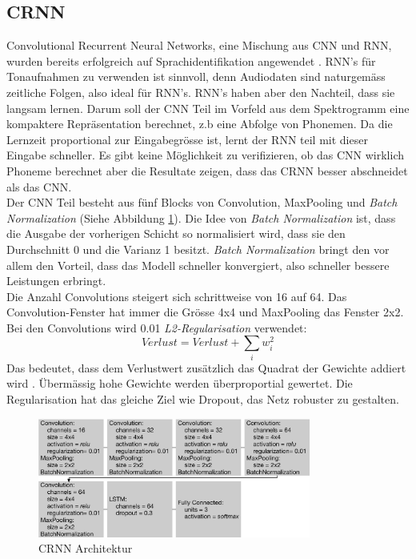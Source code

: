 \subsection{CRNN}
Convolutional Recurrent Neural Networks, eine Mischung aus CNN und RNN, wurden bereits erfolgreich auf Sprachidentifikation angewendet \parencite{crnn}\parencite{yerevann}. RNN's für Tonaufnahmen zu verwenden ist sinnvoll, denn Audiodaten sind naturgemäss zeitliche Folgen, also ideal für RNN's. RNN's haben aber den Nachteil, dass sie langsam lernen. Darum soll der CNN Teil im Vorfeld aus dem Spektrogramm eine kompaktere Repräsentation berechnet, z.b eine Abfolge von Phonemen. Da die Lernzeit proportional zur Eingabegrösse ist, lernt der RNN teil mit dieser Eingabe schneller. Es gibt keine Möglichkeit zu verifizieren, ob das CNN wirklich Phoneme berechnet aber die Resultate zeigen, dass das CRNN besser abschneidet als das CNN.
\\
Der CNN Teil besteht aus fünf Blocks von Convolution, MaxPooling und \textit{Batch Normalization}\label{Batch Normalization} (Siehe Abbildung \ref{img:crnn}). Die Idee von \textit{Batch Normalization} ist, dass die Ausgabe der vorherigen Schicht so normalisiert wird, dass sie den Durchschnitt 0 und die Varianz 1 besitzt. \textit{Batch Normalization} bringt den vor allem den Vorteil, dass das Modell schneller konvergiert, also schneller bessere Leistungen erbringt. \parencite{batch}
\\
Die Anzahl Convolutions steigert sich schrittweise von 16 auf 64. Das Convolution-Fenster hat immer die Grösse 4x4 und MaxPooling das Fenster 2x2. Bei den Convolutions wird 0.01 \textit{L2-Regularisation} verwendet:
$$ Verlust = Verlust + \sum_{i} w_{i}^{2}$$
Das bedeutet, dass dem Verlustwert zusätzlich das Quadrat der Gewichte addiert wird \parencite[Kap.~7.1.1]{goodfellow}. Übermässig hohe Gewichte werden überproportial gewertet. Die Regularisation hat das gleiche Ziel wie Dropout, das Netz robuster zu gestalten.
\\

 \begin{figure}[hbt]
	\centering
		\includegraphics[width=0.8\textwidth]{assets/crnn.png}
	\caption{CRNN Architektur}
	\label{img:crnn}
\end{figure}

